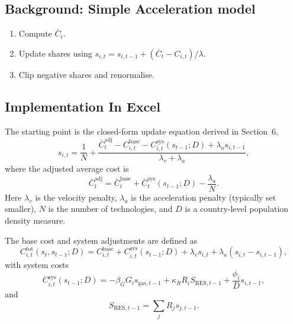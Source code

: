 \documentclass[preprint,authoryear,12pt]{elsarticle}
\begin{document}
\subsection{Background: Simple Acceleration model}

\begin{enumerate}
    \item Compute $\bar{C}_t$.
    \item Update shares using $s_{i,t} = s_{i,t-1} + (\bar{C}_t - C_{i,t})/\lambda$.
    \item Clip negative shares and renormalise.
\end{enumerate}


\subsection{Implementation In Excel}

The starting
point is the closed-form update equation derived in Section~6,
\begin{equation}
    s_{i,t}
    = \frac{1}{N}
      + \frac{
            \bar{C}_t^{\text{adj}}
          - C_{i,t}^{\text{base}}
          - C_{i,t}^{\text{sys}}(s_{t-1};D)
          + \lambda_a s_{i,t-1}
        }{\lambda_v + \lambda_a},
    \label{eq:A3_combined_update_final}
\end{equation}
where the adjusted average cost is
\begin{equation}
    \bar{C}_t^{\text{adj}}
    = \bar{C}_t^{\text{base}} + \bar{C}_t^{\text{sys}}(s_{t-1};D) - \frac{\lambda_a}{N}.
    \label{eq:A3_Cbar_adj}
\end{equation}
Here $\lambda_v$ is the velocity penalty, $\lambda_a$ is the acceleration penalty (typically set
smaller), $N$ is the number of technologies, and $D$ is a country-level population density
measure.

The base cost and system adjustments are defined as
\begin{equation}
    C_{i,t}^{\text{tot}}(s_t,s_{t-1};D)
    = C_{i,t}^{\text{base}}
      + C_{i,t}^{\text{sys}}(s_{t-1};D)
      + \lambda_v s_{i,t}
      + \lambda_a (s_{i,t} - s_{i,t-1}),
\end{equation}
with system costs
\begin{equation}
    C_{i,t}^{\text{sys}}(s_{t-1};D)
    = - \beta_G G_i s_{\text{gas},t-1}
      + \kappa_R R_i S_{\text{RES},t-1}
      + \frac{\phi_i}{D} s_{i,t-1},
    \label{eq:A3_Csys}
\end{equation}
and
\[
    S_{\text{RES},t-1} = \sum_j R_j s_{j,t-1}.
\]
\end{document}
